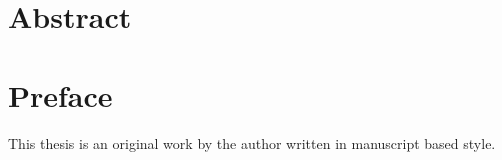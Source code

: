 
\chapter{Abstract}


\chapter{Preface}

This thesis is an original work by the author written in manuscript based style. 

  


\dedication{To ones who made this a smoother journey.} 

\tableofcontents


\listoftables


\listoffigures

